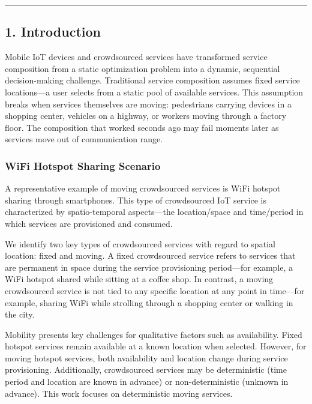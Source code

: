 \documentclass[
  10pt,
  twocolumn,
]{article}
\begin{document}
\begin{center}\rule{0.5\linewidth}{0.5pt}\end{center}

\hypertarget{introduction}{%
	\subsection{1. Introduction}\label{introduction}}

Mobile IoT devices and crowdsourced services have transformed service
composition from a static optimization problem into a dynamic,
sequential decision-making challenge. Traditional service composition
assumes fixed service locations---a user selects from a static pool of
available services. This assumption breaks when services themselves are
moving: pedestrians carrying devices in a shopping center, vehicles on a
highway, or workers moving through a factory floor. The composition that
worked seconds ago may fail moments later as services move out of
communication range.

\hypertarget{wifi-hotspot-sharing-scenario}{%
	\subsubsection{WiFi Hotspot Sharing
		Scenario}\label{wifi-hotspot-sharing-scenario}}

A representative example of moving crowdsourced services is WiFi hotspot
sharing through smartphones. This type of crowdsourced IoT service is
characterized by spatio-temporal aspects---the location/space and
time/period in which services are provisioned and consumed.

We identify two key types of crowdsourced services with regard to
spatial location: fixed and moving. A fixed crowdsourced service refers
to services that are permanent in space during the service provisioning
period---for example, a WiFi hotspot shared while sitting at a coffee
shop. In contrast, a moving crowdsourced service is not tied to any
specific location at any point in time---for example, sharing WiFi while
strolling through a shopping center or walking in the city.

Mobility presents key challenges for qualitative factors such as
availability. Fixed hotspot services remain available at a known
location when selected. However, for moving hotspot services, both
availability and location change during service provisioning.
Additionally, crowdsourced services may be deterministic (time period
and location are known in advance) or non-deterministic (unknown in
advance). This work focuses on deterministic moving services.
\end{document}
